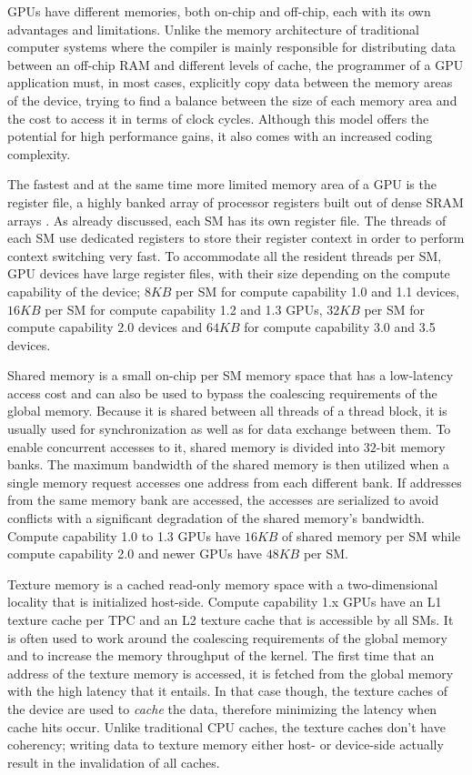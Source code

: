 \documentclass{ws-ijait}
\begin{document}
GPUs have different memories, both on-chip and off-chip, each with its own advantages and limitations. Unlike the memory architecture of traditional computer systems where the compiler is mainly responsible for distributing data between an off-chip RAM and different levels of cache, the programmer of a GPU application must, in most cases, explicitly copy data between the memory areas of the device, trying to find a balance between the size of each memory area and the cost to access it in terms of clock cycles. Although this model offers the potential for high performance gains, it also comes with an increased coding complexity.

The fastest and at the same time more limited memory area of a GPU is the register file, a highly banked array of processor registers built out of dense SRAM arrays \cite{Gebhart2012}. As already discussed, each SM has its own register file. The threads of each SM use dedicated registers to store their register context in order to perform context switching very fast. To accommodate all the resident threads per SM, GPU devices have large register files, with their size depending on the compute capability of the device; $8KB$ per SM for compute capability 1.0 and 1.1 devices, $16KB$ per SM for compute capability 1.2 and 1.3 GPUs, $32KB$ per SM for compute capability 2.0 devices and $64KB$ for compute capability 3.0 and 3.5 devices.

Shared memory is a small on-chip per SM memory space that has a low-latency access cost and can also be used to bypass the coalescing requirements of the global memory. Because it is shared between all threads of a thread block, it is usually used for synchronization as well as for data exchange between them. To enable concurrent accesses to it, shared memory is divided into $32$-bit memory banks. The maximum bandwidth of the shared memory is then utilized when a single memory request accesses one address from each different bank. If addresses from the same memory bank are accessed, the accesses are serialized to avoid conflicts with a significant degradation of the shared memory's bandwidth. Compute capability 1.0 to 1.3 GPUs have $16KB$ of shared memory per SM while compute capability 2.0 and newer GPUs have $48KB$ per SM.

Texture memory is a cached read-only memory space with a two-dimensional locality that is initialized host-side. Compute capability 1.x GPUs have an L1 texture cache per TPC and an L2 texture cache that is accessible by all SMs. It is often used to work around the coalescing requirements of the global memory and to increase the memory throughput of the kernel. The first time that an address of the texture memory is accessed, it is fetched from the global memory with the high latency that it entails. In that case though, the texture caches of the device are used to \textit{cache} the data, therefore minimizing the latency when cache hits occur. Unlike traditional CPU caches, the texture caches don't have coherency; writing data to texture memory either host- or device-side actually result in the invalidation of all caches.
\end{document}
